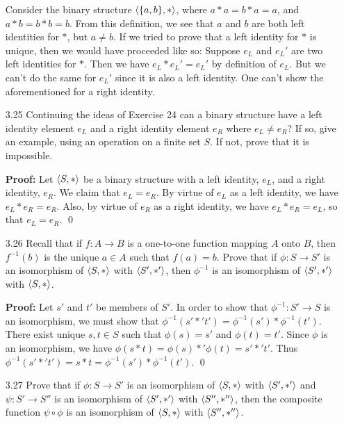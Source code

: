 \begin{enumerate}
      Consider the binary structure $\langle \{a, b\}, * \rangle$, where
      $a * a = b * a = a$, and $a * b = b * b = b$. From this definition, we see
      that $a$ and $b$ are both left identities for $*$, but $a \neq b$. If we
      tried to prove that a left identity for $*$ is unique, then we would have
      proceeded like so: Suppose $e_L$ and $e_L'$ are two left identities for
      $*$. Then we have $e_L * e_L' = e_L'$ by definition of $e_L$. But we can't
      do the same for $e_L'$ since it is also a left identity. One can't show
      the aforementioned for a right identity.
   \item[3.25] Continuing the ideas of Exercise 24 can a binary structure have a
               left identity element $e_L$ and a right identity element $e_R$ 
               where $e_L \neq e_R$? If so, give an example, using an operation
               on a finite set $S$. If not, prove that it is impossible.

      \textbf{Proof:} Let $\langle S, * \rangle$ be a binary structure with a left
      identity, $e_L$, and a right identity, $e_R$. We claim that $e_L = e_R$.
      By virtue of $e_L$ as a left identity, we have $e_L * e_R = e_R$. Also, by
      virtue of $e_R$ as a right identity, we have $e_L * e_R = e_L$, so that
      $e_L = e_R$. \qed
   \item[3.26] Recall that if $f : A \rightarrow B$ is a one-to-one function
               mapping $A$ onto $B$, then $f^{-1}(b)$ is the unique $a \in A$
               such that $f(a) = b$. Prove that if $\phi : S \rightarrow S'$ is
               an isomorphism of $\langle S, * \rangle$ with $\langle S', *' \rangle$, then
               $\phi^{-1}$ is an isomorphism of $\langle S', *' \rangle$ with
               $\langle S, * \rangle$.

      \textbf{Proof:} Let $s'$ and $t'$ be members of $S'$. In order to show 
      that $\phi^{-1} : S' \rightarrow S$ is an isomorphism, we must show that
      $\phi^{-1}(s' *' t') = \phi^{-1}(s') * \phi^{-1}(t')$. There exist unique
      $s, t \in S$ such that $\phi(s) = s'$ and $\phi(t) = t'$. Since $\phi$ is
      an isomorphism, we have $\phi(s * t) = \phi(s) *' \phi(t) = s' *' t'$. 
      Thus $\phi^{-1}(s' *' t') = s * t = \phi^{-1}(s') * \phi^{-1}(t')$. \qed
   \item[3.27] Prove that if $\phi : S \rightarrow S'$ is an isomorphism of
               $\langle S, * \rangle$ with $\langle S', *' \rangle$ and $\psi : S' \rightarrow S''$
               is an isomorphism of $\langle S', *' \rangle$ with $\langle S'', *'' \rangle$, then
               the composite function $\psi \circ \phi$ is an isomorphism of
               $\langle S, * \rangle$ with $\langle S'', *'' \rangle$.


\end{enumerate}
